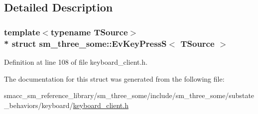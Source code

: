 \subsection{Detailed Description}
\subsubsection*{template$<$typename T\+Source$>$\\*
struct sm\+\_\+three\+\_\+some\+::\+Ev\+Key\+Press\+S$<$ T\+Source $>$}



Definition at line 108 of file keyboard\+\_\+client.\+h.



The documentation for this struct was generated from the following file\+:\begin{DoxyCompactItemize}
\item 
smacc\+\_\+sm\+\_\+reference\+\_\+library/sm\+\_\+three\+\_\+some/include/sm\+\_\+three\+\_\+some/substate\+\_\+behaviors/keyboard/\hyperlink{keyboard__client_8h}{keyboard\+\_\+client.\+h}\end{DoxyCompactItemize}
